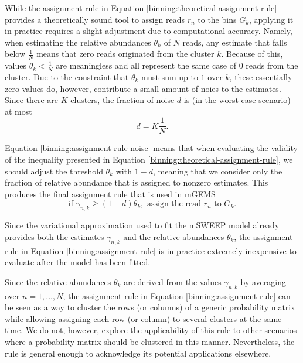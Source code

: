 \documentclass[officiallayout]{tktla}
\begin{document}
While the assignment rule in Equation
\ref{binning:theoretical-assignment-rule} provides a theoretically
sound tool to assign reads $r_{n}$ to the bins $G_{k}$, applying it in
practice requires a slight adjustment due to computational
accuracy. Namely, when estimating the relative abundances $\theta_{k}$
of $N$ reads, any estimate that falls below $\frac{1}{N}$ means that
zero reads originated from the cluster $k$. Because of this, values
$\theta_{k} < \frac{1}{N}$ are meaningless and all represent the same
case of 0 reads from the cluster. Due to the constraint that
$\theta_{k}$ must sum up to $1$ over $k$, these essentially-zero
values do, however, contribute a small amount of noies to the
estimates. Since there are $K$ clusters, the fraction of noise $d$ is
(in the worst-case scenario) at most
\begin{equation}
  \label{binning:assignment-rule-noise}
  d = K\frac{1}{N}.
\end{equation}

Equation \ref{binning:assignment-rule-noise} means that when
evaluating the validity of the inequality presented in Equation
\ref{binning:theoretical-assignment-rule}, we should adjust the
threshold $\theta_k$ with $1 - d$, meaning that we consider only the
fraction of relative abundance that is assigned to nonzero
estimates. This produces the final assignment rule that is used in
mGEMS
\begin{equation}
  \label{binning:assignment-rule}
  \text{if } \gamma_{n, k} \geq (1 - d)\theta_{k}, \text{ assign the read } r_{n} \text{ to } G_{k}.
\end{equation}

Since the variational approximation used to fit the mSWEEP model
already provides both the estimates $\gamma_{n, k}$ and the relative
abundances $\theta_{k}$, the assignment rule in Equation
\ref{binning:assignment-rule} is in practice extremely inexpensive to
evaluate after the model has been fitted.

Since the relative abundances $\theta_k$ are derived from the values
$\gamma_{n, k}$ by averaging over $n = 1, \dots, N$, the assignment
rule in Equation \ref{binning:assignment-rule} can be seen as a way to
cluster the rows (or columns) of a generic probability matrix while
allowing assigning each row (or column) to several clusters at the
same time. We do not, however, explore the applicability of this rule
to other scenarios where a probability matrix should be clustered in
this manner. Nevertheless, the rule is general enough to acknowledge
its potential applications elsewhere.
\end{document}
